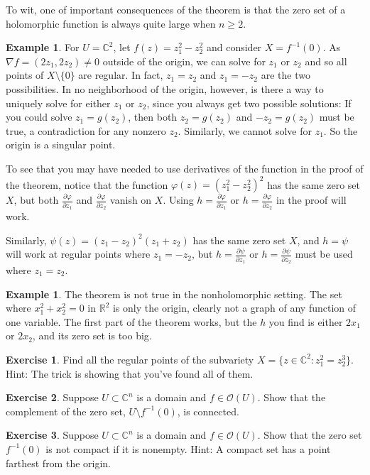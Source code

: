 \documentclass[12pt,openany]{book}
\newcommand{\C}{{\mathbb{C}}}
\newcommand{\R}{{\mathbb{R}}}
\newcommand{\sO}{{\mathscr{O}}}
\theoremstyle{plain}
\theoremstyle{remark}
\theoremstyle{definition}
\newenvironment{exbox}{%
    \def\FrameCommand{\vrule width 1pt \relax\hspace{10pt}}%
    \MakeFramed{\advance\hsize-\width\FrameRestore}%
}{%
    \endMakeFramed
}
\theoremstyle{exercise}
\newtheorem{exercise}{Exercise}[section]
\theoremstyle{example}
\newtheorem{example}[thm]{Example}
\begin{document}
To wit, one of important consequences of the theorem is that the zero set of
a holomorphic function is always quite large when $n \geq 2$.

\begin{example}
For $U = \C^2$,
let $f(z) = z_1^2-z_2^2$ and consider $X = f^{-1}(0)$. As $\nabla f =
(2z_1,2z_2) \not= 0$
outside of the origin, we can solve for $z_1$ or $z_2$ and so
all points of $X \setminus \{ 0 \}$ are regular.  In fact,
$z_1 = z_2$ and $z_1 = -z_2$ are the two possibilities.
In no neighborhood of the origin, however, is there a way to uniquely solve for either
$z_1$ or $z_2$, since you always get two possible solutions:  If you could
solve $z_1 = g(z_2)$, then both $z_2 = g(z_2)$ and $-z_2 = g(z_2)$ must be
true, a contradiction for any nonzero $z_2$.  Similarly,
we cannot solve for $z_1$.
So the origin is a singular point.

To see that you may have needed to use derivatives of the function in the
proof of the theorem,
notice
that the function $\varphi(z) = {(z_1^2-z_2^2)}^2$ has the same zero set $X$,
but both
$\frac{\partial \varphi}{\partial z_1}$ and
$\frac{\partial \varphi}{\partial z_2}$ vanish on $X$.  Using
$h= \frac{\partial \varphi}{\partial z_1}$ or
$h= \frac{\partial \varphi}{\partial z_2}$ in the proof will work.

Similarly, $\psi(z) = {(z_1-z_2)}^2 (z_1+z_2)$ has the same
zero set $X$, and $h=\psi$ will work at regular points where $z_1 = -z_2$,
but $h = \frac{\partial \psi}{\partial z_1}$ or
$h = \frac{\partial \psi}{\partial z_2}$ must be used where $z_1 = z_2$.
\end{example}

\begin{example}
\pagebreak[2]
The theorem is not true in the nonholomorphic setting.  The set
where $x_1^2 +  x_2^2 = 0$ in $\R^2$ is only the origin, clearly not a graph
of any function of one variable.  The first part of the theorem works, but
the $h$ you find is either $2x_1$ or $2x_2$, and its zero set is too big.
\end{example}

\begin{exbox}
\begin{exercise}
Find all the regular points of the subvariety
$X = \bigl\{ z \in \C^2 : z_1^2 = z_2^3 \bigr\}$.
Hint: The trick is showing that you've found all of them.
\end{exercise}

\begin{exercise} \label{exercise:connectedcomplement}
Suppose $U \subset \C^n$ is a domain and $f \in \sO(U)$.
Show that the complement of the zero set, $U \setminus f^{-1}(0)$, is
connected.
\end{exercise}

\begin{exercise} \label{exercise:zerosetnotcompact}
Suppose $U \subset \C^n$ is a domain and $f \in \sO(U)$.
Show that the zero set $f^{-1}(0)$ is not compact if it is nonempty.
Hint: A compact set has a point farthest from the origin.
\end{exercise}
\end{exbox}
\end{document}
